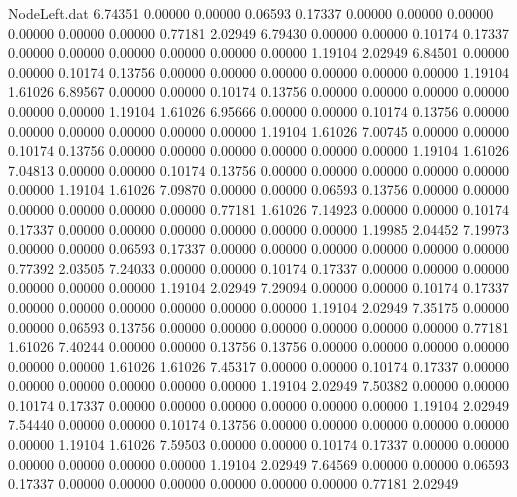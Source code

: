 \begin{filecontents}{NodeLeft.dat}
   6.74351    0.00000    0.00000     0.06593    0.17337    0.00000    0.00000    0.00000    0.00000    0.00000    0.00000    0.77181    2.02949
   6.79430    0.00000    0.00000     0.10174    0.17337    0.00000    0.00000    0.00000    0.00000    0.00000    0.00000    1.19104    2.02949
   6.84501    0.00000    0.00000     0.10174    0.13756    0.00000    0.00000    0.00000    0.00000    0.00000    0.00000    1.19104    1.61026
   6.89567    0.00000    0.00000     0.10174    0.13756    0.00000    0.00000    0.00000    0.00000    0.00000    0.00000    1.19104    1.61026
   6.95666    0.00000    0.00000     0.10174    0.13756    0.00000    0.00000    0.00000    0.00000    0.00000    0.00000    1.19104    1.61026
   7.00745    0.00000    0.00000     0.10174    0.13756    0.00000    0.00000    0.00000    0.00000    0.00000    0.00000    1.19104    1.61026
   7.04813    0.00000    0.00000     0.10174    0.13756    0.00000    0.00000    0.00000    0.00000    0.00000    0.00000    1.19104    1.61026
   7.09870    0.00000    0.00000     0.06593    0.13756    0.00000    0.00000    0.00000    0.00000    0.00000    0.00000    0.77181    1.61026
   7.14923    0.00000    0.00000     0.10174    0.17337    0.00000    0.00000    0.00000    0.00000    0.00000    0.00000    1.19985    2.04452
   7.19973    0.00000    0.00000     0.06593    0.17337    0.00000    0.00000    0.00000    0.00000    0.00000    0.00000    0.77392    2.03505
   7.24033    0.00000    0.00000     0.10174    0.17337    0.00000    0.00000    0.00000    0.00000    0.00000    0.00000    1.19104    2.02949
   7.29094    0.00000    0.00000     0.10174    0.17337    0.00000    0.00000    0.00000    0.00000    0.00000    0.00000    1.19104    2.02949
   7.35175    0.00000    0.00000     0.06593    0.13756    0.00000    0.00000    0.00000    0.00000    0.00000    0.00000    0.77181    1.61026
   7.40244    0.00000    0.00000     0.13756    0.13756    0.00000    0.00000    0.00000    0.00000    0.00000    0.00000    1.61026    1.61026
   7.45317    0.00000    0.00000     0.10174    0.17337    0.00000    0.00000    0.00000    0.00000    0.00000    0.00000    1.19104    2.02949
   7.50382    0.00000    0.00000     0.10174    0.17337    0.00000    0.00000    0.00000    0.00000    0.00000    0.00000    1.19104    2.02949
   7.54440    0.00000    0.00000     0.10174    0.13756    0.00000    0.00000    0.00000    0.00000    0.00000    0.00000    1.19104    1.61026
   7.59503    0.00000    0.00000     0.10174    0.17337    0.00000    0.00000    0.00000    0.00000    0.00000    0.00000    1.19104    2.02949
   7.64569    0.00000    0.00000     0.06593    0.17337    0.00000    0.00000    0.00000    0.00000    0.00000    0.00000    0.77181    2.02949

\end{filecontents}
